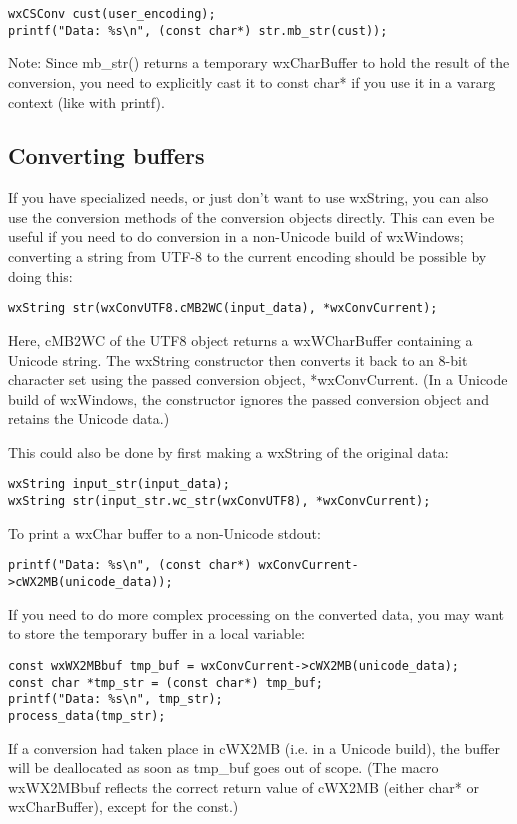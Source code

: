 \begin{verbatim}
wxCSConv cust(user_encoding);
printf("Data: %s\n", (const char*) str.mb_str(cust));
\end{verbatim}

Note: Since mb_str() returns a temporary wxCharBuffer to hold the result
of the conversion, you need to explicitly cast it to const char* if you use
it in a vararg context (like with printf).

\subsection{Converting buffers}

If you have specialized needs, or just don't want to use wxString, you
can also use the conversion methods of the conversion objects directly.
This can even be useful if you need to do conversion in a non-Unicode
build of wxWindows; converting a string from UTF-8 to the current
encoding should be possible by doing this:

\begin{verbatim}
wxString str(wxConvUTF8.cMB2WC(input_data), *wxConvCurrent);
\end{verbatim}

Here, cMB2WC of the UTF8 object returns a wxWCharBuffer containing a Unicode
string. The wxString constructor then converts it back to an 8-bit character
set using the passed conversion object, *wxConvCurrent. (In a Unicode build
of wxWindows, the constructor ignores the passed conversion object and
retains the Unicode data.)

This could also be done by first making a wxString of the original data:

\begin{verbatim}
wxString input_str(input_data);
wxString str(input_str.wc_str(wxConvUTF8), *wxConvCurrent);
\end{verbatim}

To print a wxChar buffer to a non-Unicode stdout:

\begin{verbatim}
printf("Data: %s\n", (const char*) wxConvCurrent->cWX2MB(unicode_data));
\end{verbatim}

If you need to do more complex processing on the converted data, you
may want to store the temporary buffer in a local variable:

\begin{verbatim}
const wxWX2MBbuf tmp_buf = wxConvCurrent->cWX2MB(unicode_data);
const char *tmp_str = (const char*) tmp_buf;
printf("Data: %s\n", tmp_str);
process_data(tmp_str);
\end{verbatim}

If a conversion had taken place in cWX2MB (i.e. in a Unicode build),
the buffer will be deallocated as soon as tmp_buf goes out of scope.
(The macro wxWX2MBbuf reflects the correct return value of cWX2MB
(either char* or wxCharBuffer), except for the const.)


